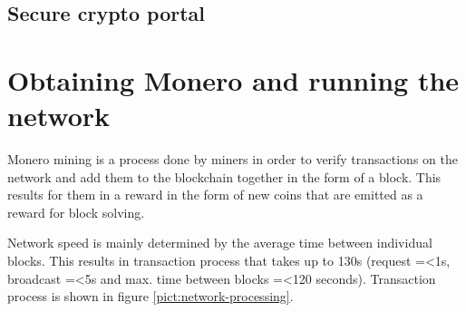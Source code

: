 \documentclass[
  printed, %
  table,   %
  nolof,     %
  nolot,     %
           oneside, color
]{fithesis3}
\begin{document}
\section{Secure crypto portal}



\chapter{Obtaining Monero and running the network}
Monero mining is a process done by miners in order to verify transactions on the network and add them to the blockchain together in the form of a block. This results for them in a reward in the form of new coins that are emitted as a reward for block solving.

Network speed is mainly determined by the average time between individual blocks. %
This results in transaction process that takes up to 130s (request =\textless 1s, broadcast =\textless 5s and max. time between blocks =\textless 120 seconds).  Transaction process is shown in figure \ref{pict:network-processing}.
\end{document}
